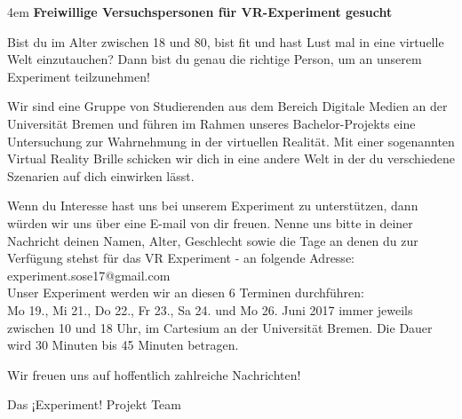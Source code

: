 \documentclass{Bericht}
\begin{document}
\par
\begingroup
\leftskip4em
\textbf{Freiwillige Versuchspersonen für VR-Experiment gesucht}

Bist du im Alter zwischen 18 und 80, bist fit und hast Lust mal in eine virtuelle Welt einzutauchen? Dann bist du genau die richtige Person, um an unserem Experiment teilzunehmen!

Wir sind eine Gruppe von Studierenden aus dem Bereich Digitale Medien an der Universität Bremen und führen im Rahmen unseres Bachelor-Projekts eine Untersuchung zur Wahrnehmung in der virtuellen Realität. Mit einer sogenannten Virtual Reality Brille schicken wir dich in eine andere Welt in der du verschiedene Szenarien auf dich einwirken lässt.

Wenn du Interesse hast uns bei unserem Experiment zu unterstützen, dann würden wir uns über eine E-mail von dir freuen. Nenne uns bitte in deiner Nachricht deinen Namen, Alter, Geschlecht sowie die Tage an denen du zur Verfügung stehst für das VR Experiment - an folgende Adresse: experiment.sose17@gmail.com \\

Unser Experiment werden wir an diesen 6 Terminen durchführen: \\

Mo 19., Mi 21., Do 22., Fr 23., Sa 24. und Mo 26. Juni 2017 immer jeweils zwischen 10 und 18 Uhr, im Cartesium an der Universität Bremen. Die Dauer wird 30 Minuten bis 45 Minuten betragen.

Wir freuen uns auf hoffentlich zahlreiche Nachrichten!

Das ¡Experiment! Projekt Team


\endgroup
{}
\end{document}
